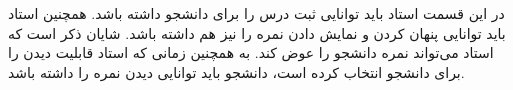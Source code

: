 در این قسمت استاد باید توانایی ثبت درس را برای دانشجو داشته باشد.  
همچنین استاد باید توانایی پنهان کردن و نمایش دادن نمره را نیز هم داشته باشد.  
شایان ذکر است که استاد می‌تواند نمره دانشجو را عوض کند.  
به همچنین زمانی که استاد قابلیت دیدن را برای دانشجو انتخاب کرده است، دانشجو باید توانایی دیدن نمره را داشته باشد.
